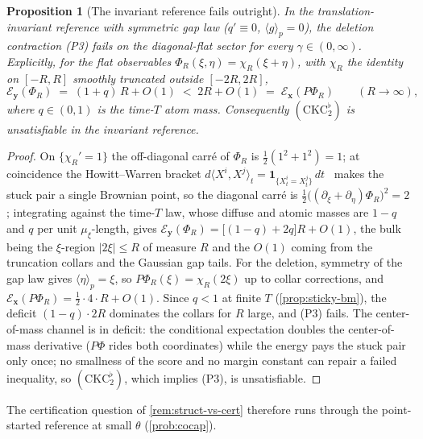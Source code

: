 \documentclass[reqno,final,11pt]{amsart}
\theoremstyle{plain}
\newtheorem{proposition}[theorem]{Proposition}
\theoremstyle{definition}
\theoremstyle{remark}
\newcommand{\cE}{\mathcal E}
\begin{document}
\begin{proposition}[The invariant reference fails outright]
\label{prop:invariant-fails}
In the translation-invariant reference with symmetric gap law ($q'\equiv0$,
$\langle g\rangle_p=0$), the deletion contraction \textnormal{(P3)} fails on
the diagonal-flat sector for every $\gamma\in(0,\infty)$. Explicitly, for
the flat observables $\Phi_R(\xi,\eta)=\chi_R(\xi+\eta)$, with $\chi_R$ the
identity on $[-R,R]$ smoothly truncated outside $[-2R,2R]$,
\[
  \cE_{\mathbf y}(\Phi_R)\;=\;(1+q)\,R+O(1)
  \;<\;2R+O(1)\;=\;\cE_{\mathbf x}(P\Phi_R)
  \qquad(R\to\infty),
\]
where $q\in(0,1)$ is the time-$T$ atom mass. Consequently
$(\mathrm{CKC}_2^{\flat})$ is unsatisfiable in the invariant reference.
\end{proposition}
\begin{proof}
On $\{\chi_R'=1\}$ the off-diagonal carr\'e of $\Phi_R$ is
$\tfrac12(1^2+1^2)=1$; at coincidence the Howitt--Warren bracket
$d\langle X^i,X^j\rangle_t=\mathbf 1_{\{X^i_t=X^j_t\}}\,dt$~\citep{HowittWarren}
makes the stuck pair a single Brownian point, so the diagonal carr\'e is
$\tfrac12\bigl((\partial_\xi+\partial_\eta)\Phi_R\bigr)^2=2$; integrating
against the time-$T$ law, whose diffuse and atomic masses are $1-q$ and $q$
per unit $\mu_\xi$-length, gives
$\cE_{\mathbf y}(\Phi_R)=\bigl[(1-q)+2q\bigr]R+O(1)$, the bulk being the
$\xi$-region $|2\xi|\le R$ of measure $R$ and the $O(1)$ coming from the
truncation collars and the Gaussian gap tails. For the deletion, symmetry
of the gap law gives $\langle\eta\rangle_p=\xi$, so $P\Phi_R(\xi)=\chi_R(2\xi)$
up to collar corrections, and
$\cE_{\mathbf x}(P\Phi_R)=\tfrac12\cdot4\cdot R+O(1)$. Since $q<1$ at
finite $T$ (\cref{prop:sticky-bm}), the deficit $(1-q)\cdot2R$ dominates
the collars for $R$ large, and \textnormal{(P3)} fails. The center-of-mass
channel is in deficit: the conditional expectation doubles the
center-of-mass derivative ($P\Phi$ rides both coordinates) while the
energy pays the stuck pair only once; no smallness of the score and no
margin constant can repair a failed inequality, so
$(\mathrm{CKC}_2^{\flat})$, which implies \textnormal{(P3)}, is
unsatisfiable.
\end{proof}

The certification question of \cref{rem:struct-vs-cert} therefore runs
through the point-started reference at small $\theta$ (\cref{prob:cocap}).
\end{document}
